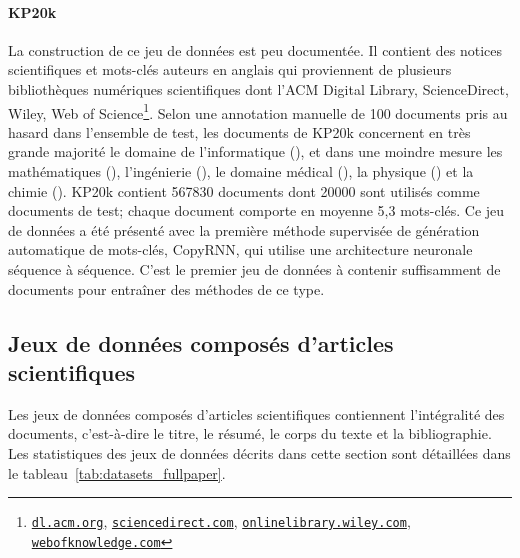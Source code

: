 \paragraph{KP20k~\cite{meng_deep_2017}}
La construction de ce jeu de données est peu documentée. Il contient des notices scientifiques et mots-clés auteurs en anglais qui proviennent de plusieurs bibliothèques numériques scientifiques dont l'ACM Digital Library, ScienceDirect, Wiley, Web of Science\footnote{\texttt{\href{https://dl.acm.org}{dl.acm.org}}, \texttt{\href{https://www.sciencedirect.com}{sciencedirect.com}}, \texttt{\href{https://www.onlinelibrary.wiley.com}{onlinelibrary.wiley.com}}, \texttt{\href{https://www.webofknowledge.com}{webofknowledge.com}}}.
Selon une annotation manuelle de 100 documents pris au hasard dans l'ensemble de test, les documents de KP20k concernent en très grande majorité le domaine de l'informatique (), et dans une moindre mesure les mathématiques (), l'ingénierie (), le domaine médical (), la physique () et la chimie ().
KP20k contient \num{567 830} documents dont \num{20 000} sont utilisés comme documents de test; chaque document comporte en moyenne 5,3 mots-clés.
Ce jeu de données a été présenté avec la première méthode supervisée de génération automatique de mots-clés, CopyRNN, qui utilise une architecture neuronale séquence à séquence. C'est le premier jeu de données à contenir suffisamment de documents pour entraîner des méthodes de ce type.

\subsection{Jeux de données composés d'articles scientifiques}\label{sub:framework_full}

Les jeux de données composés d'articles scientifiques contiennent l'intégralité des documents, c'est-à-dire le titre, le résumé, le corps du texte et la bibliographie.
Les statistiques des jeux de données décrits dans cette section sont détaillées dans le tableau~\ref{tab:datasets_fullpaper}.


